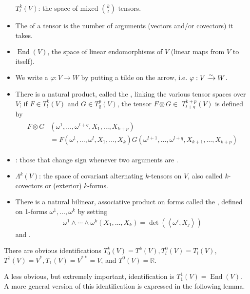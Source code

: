 \documentclass[12pt]{article} %
\begin{document}
\begin{defa}
\begin{itemize}
$T_{l}^{k}(V)$: the space of mixed $\binom{k}{l}$-tensors. 
\item The  of a tensor is the number of arguments (vectors and/or covectors) it takes.
\item $\operatorname{End}(V)$, the space of linear endomorphisms of $V$ (linear maps from $V$ to itself). 
\item We write a  $\varphi : V \to W$ by putting a tilde on the arrow, i.e. $\varphi : V \xrightarrow{\sim} W$.
\item There is a natural product, called the , linking the various tensor spaces over $V$; if $F \in T_{l}^{k}(V)$ and $G \in T_{q}^{p}(V)$, the tensor $F \otimes G \in$ $T_{l+q}^{k+p}(V)$ is defined by
\begin{align*}
\begin{aligned}
F \otimes G &\left(\omega^{1}, \ldots, \omega^{l+q}, X_{1}, \ldots, X_{k+p}\right) \\
&=F\left(\omega^{1}, \ldots, \omega^{l}, X_{1}, \ldots, X_{k}\right) G\left(\omega^{l+1}, \ldots, \omega^{l+q}, X_{k+1}, \ldots, X_{k+p}\right)
\end{aligned}
\end{align*}
\item {}: those that change sign whenever two arguments are .
\item $\Lambda^{k}(V)$: the space of covariant alternating $k$-tensors on $V$, also called $k$-covectors or (exterior) $k$-forms.
\item There is a natural bilinear, associative product on forms called the , defined on 1-forms $\omega^{1}, \ldots, \omega^{k}$ by setting
\begin{align*}
\omega^{1} \wedge \cdots \wedge \omega^{k}\left(X_{1}, \ldots, X_{k}\right)=\operatorname{det}\left(\left\langle\omega^{i}, X_{j}\right\rangle\right)
\end{align*}
and . 

\end{itemize}
\end{defa}
\begin{rema}
There are obvious identifications $T_{0}^{k}(V)=T^{k}(V), T_{l}^{0}(V)=T_{l}(V)$, $T^{1}(V)=V^{*}, T_{1}(V)=V^{* *}=V$, and $T^{0}(V)=\mathbb{R}$. 
\end{rema}
A less obvious, but extremely important, identification is $T_{1}^{1}(V)=\operatorname{End}(V)$. A more general version of this identification is expressed in the following lemma.
\end{document}
